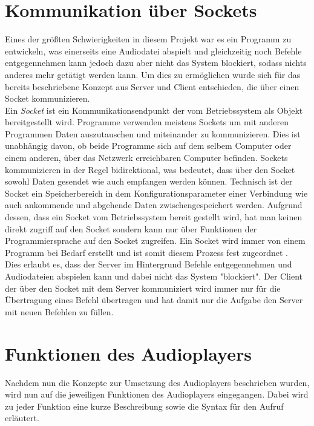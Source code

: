 \section{Kommunikation über Sockets}
Eines der größten Schwierigkeiten in diesem Projekt war es ein Programm zu
entwickeln, was einerseits eine Audiodatei abspielt und gleichzeitig noch
Befehle entgegennehmen kann jedoch dazu aber nicht das System blockiert, sodass
nichts anderes mehr getätigt werden kann. Um dies zu ermöglichen wurde sich für
das bereits beschriebene Konzept aus Server und Client entschieden, die über
einen Socket kommunizieren. \\
Ein \textit{Socket} ist ein Kommunikationsendpunkt der vom Betriebssystem als
Objekt bereitgestellt wird. Programme verwenden meistens Sockets um mit anderen
Programmen Daten auszutauschen und miteinander zu kommunizieren. Dies ist
unabhängig davon, ob beide Programme sich auf dem selbem Computer oder einem
anderen, über das Netzwerk erreichbaren Computer befinden. Sockets
kommunizieren in der Regel bidirektional, was bedeutet, dass über den Socket
sowohl Daten gesendet wie auch empfangen werden können. Technisch ist der
Socket ein Speicherbereich in dem Konfigurationsparameter einer Verbindung wie
auch ankommende und abgehende Daten zwischengespeichert werden. Aufgrund
dessen, dass ein Socket vom Betriebssystem bereit gestellt wird, hat man keinen
direkt zugriff auf den Socket sondern kann nur über Funktionen der
Programmiersprache auf den Socket zugreifen.
Ein Socket wird immer von einem Programm bei Bedarf erstellt und ist somit
diesem Prozess fest zugeordnet \autocite{pollakowski_2012}. \\
Dies erlaubt es, dass der Server im Hintergrund Befehle entgegennehmen und
Audiodateien abspielen kann und dabei nicht das System "blockiert". Der Client
der über den Socket mit dem Server kommuniziert wird immer nur für die
Übertragung eines Befehl übertragen und hat damit nur die Aufgabe den Server
mit neuen Befehlen zu füllen.

\section{Funktionen des Audioplayers}
Nachdem nun die Konzepte zur Umsetzung des Audioplayers beschrieben wurden,
wird nun auf die jeweiligen Funktionen des Audioplayers eingegangen. Dabei wird
zu jeder Funktion eine kurze Beschreibung sowie die Syntax für den Aufruf
erläutert.

